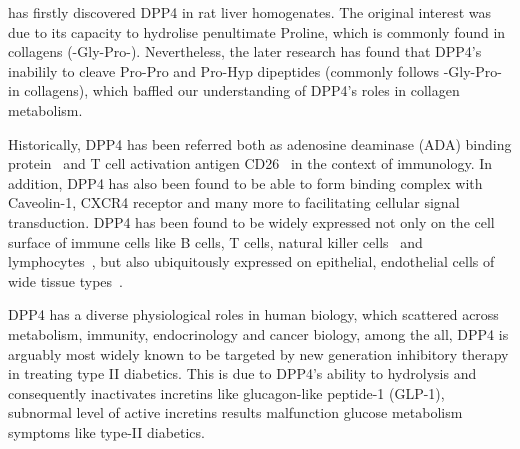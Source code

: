 \citet{Hopsu-Havu1966} has firstly discovered DPP4 in rat liver homogenates. The original interest was due to its capacity to hydrolise penultimate Proline, which is commonly found in collagens (-Gly-Pro-). Nevertheless, the later research has found that DPP4's inabilily to cleave Pro-Pro and Pro-Hyp dipeptides (commonly follows -Gly-Pro- in collagens), which baffled our understanding of DPP4's roles in collagen metabolism.
\par
Historically, DPP4 has been referred both as adenosine deaminase (ADA) binding protein~\cite{Kameoka_1993} and T cell activation antigen CD26~\cite{Fleischer_1994} in the context of immunology. In addition, DPP4 has also been found to be able to form binding complex with Caveolin-1, CXCR4 receptor and many more to facilitating cellular signal transduction. DPP4 has been found to be widely expressed not only on the cell surface of immune cells like B cells, T cells, natural killer cells~\cite{Fleischer1987,Fleischer1988,Gorrell1991,Capuani2018,Bühling1994,Bühling1995} and lymphocytes~\cite{Gorvel1991}, but also ubiquitously expressed on epithelial, endothelial cells of wide tissue types~\cite{Gorrell2001,Mulvihill_2014}.
\par 
DPP4 has a diverse physiological roles in human biology, which scattered across metabolism, immunity, endocrinology and cancer biology, among the all, DPP4 is arguably most widely known to be targeted by new generation inhibitory therapy in treating type II diabetics. This is due to DPP4's ability to hydrolysis and consequently inactivates incretins like glucagon-like peptide-1 (GLP-1), subnormal level of active incretins results malfunction glucose metabolism symptoms like type-II diabetics. 
\par 
